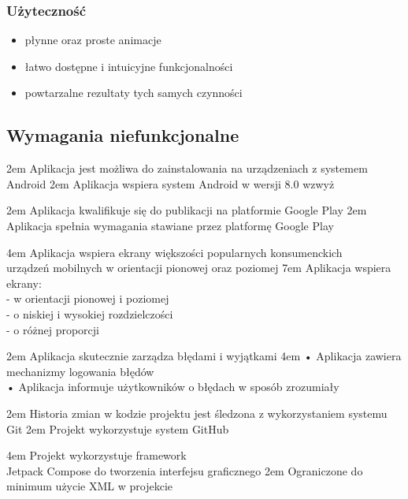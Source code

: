 \subsubsection{Użyteczność}

\begin{itemize}[leftmargin=*]
    \item płynne oraz proste animacje
    \item łatwo dostępne i intuicyjne funkcjonalności
    \item powtarzalne rezultaty tych samych czynności
\end{itemize}

\newpage

\subsection{Wymagania niefunkcjonalne}

{2em}{
    Aplikacja jest możliwa do zainstalowania na urządzeniach z systemem Android
}
{2em}{
    Aplikacja wspiera system Android w wersji 8.0 wzwyż
}

{2em}{
    Aplikacja kwalifikuje się do publikacji na platformie Google Play
}
{2em}{
    Aplikacja spełnia wymagania stawiane przez platformę Google Play
}

{4em}{
    Aplikacja wspiera ekrany większości popularnych konsumenckich\\
    urządzeń mobilnych w orientacji pionowej oraz poziomej
}
{7em}{
    Aplikacja wspiera ekrany:\\
    - w orientacji pionowej i poziomej\\
    - o niskiej i wysokiej rozdzielczości\\
    - o różnej proporcji
}

{2em}{
    Aplikacja skutecznie zarządza błędami i wyjątkami
}
{4em}{
    • Aplikacja zawiera mechanizmy logowania błędów\\
    • Aplikacja informuje użytkowników o błędach w sposób zrozumiały
}

{2em}{
    Historia zmian w kodzie projektu jest śledzona z wykorzystaniem systemu Git
}
{2em}{
    Projekt wykorzystuje system GitHub
}

{4em}{
    Projekt wykorzystuje framework\\
    Jetpack Compose do tworzenia interfejsu graficznego
}
{2em}{
    Ograniczone do minimum użycie XML w projekcie
}

